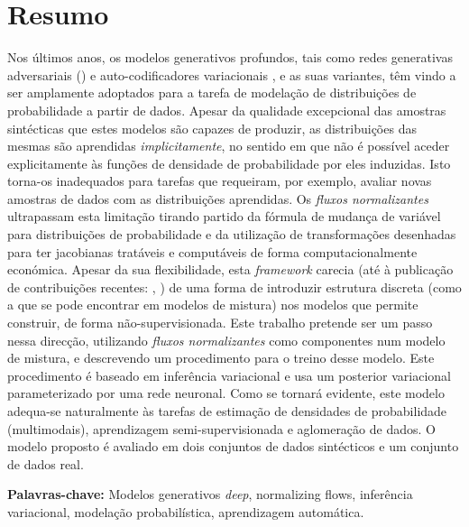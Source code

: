 \section*{Resumo}


Nos últimos anos, os modelos generativos profundos, tais como redes generativas
adversariais (\autocite{GAN}) e auto-codificadores variacionais \autocite{vaepaper},
e as suas variantes, têm vindo a ser amplamente adoptados para a tarefa de modelação
de distribuições de probabilidade a partir de dados. Apesar da qualidade excepcional das amostras sintécticas
que estes modelos são capazes de produzir, as distribuições das mesmas são aprendidas
\emph{implicitamente}, no sentido em que não é possível aceder explicitamente às funções de densidade
de probabilidade por eles induzidas. Isto torna-os inadequados para tarefas que
requeiram, por exemplo, avaliar novas amostras de dados com as distribuições
aprendidas. Os \emph{fluxos normalizantes} ultrapassam esta limitação tirando partido da
fórmula de mudança de variável para distribuições de probabilidade e da utilização
de transformações desenhadas para ter jacobianas tratáveis e computáveis de forma
computacionalmente económica. Apesar da sua flexibilidade, esta \emph{framework} carecia (até à publicação
de contribuições recentes: \autocite{semisuplearning_nflows}, \autocite{RAD}) de uma forma
de introduzir estrutura discreta (como a que se pode encontrar em modelos de mistura)
nos modelos que permite construir, de forma não-supervisionada. Este trabalho
pretende ser um passo nessa direcção, utilizando \emph{fluxos normalizantes} como
componentes num modelo de mistura, e descrevendo um procedimento para o treino
desse modelo. Este procedimento é baseado em inferência variacional e usa um posterior
variacional parameterizado por uma rede neuronal. Como se tornará evidente, este
modelo adequa-se naturalmente às tarefas de estimação de densidades de probabilidade (multimodais),
aprendizagem semi-supervisionada e aglomeração de dados. O modelo proposto é
avaliado em dois conjuntos de dados sintécticos e um conjunto de dados real.
\vfill

\textbf{\Large Palavras-chave:} Modelos generativos \emph{deep}, normalizing flows,
inferência variacional, modelação probabilística, aprendizagem automática.
